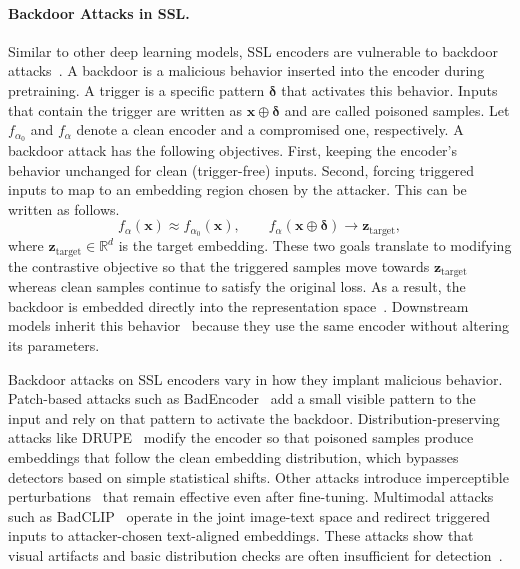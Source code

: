 \documentclass[letterpaper,twocolumn,10pt]{article}
\newcommand{\nhat}[1]{\textcolor{red}{Nhat: #1}}
\begin{document}

\paragraph{Backdoor Attacks in SSL.}
Similar to other deep learning models, SSL encoders are vulnerable to backdoor attacks~\cite{jia2022badencoder}. A backdoor is a malicious behavior inserted into the encoder during pretraining. A trigger is a specific pattern $\bm{\delta}$ that activates this behavior. Inputs that contain the trigger are written as $\mathbf{x} \oplus \bm{\delta}$ and are called poisoned samples.
Let $f_{\alpha_0}$ and $f_{\alpha}$ denote a clean encoder and a compromised one, respectively. A backdoor attack has the following objectives. First, keeping the encoder's behavior unchanged for clean (trigger-free) inputs. Second, forcing triggered inputs to map to an embedding region chosen by the attacker. This can be written as follows.
\begin{equation}
    f_{\alpha}(\mathbf{x}) \approx f_{\alpha_0}(\mathbf{x}),
    \qquad
    f_{\alpha}(\mathbf{x} \oplus \bm{\delta}) \rightarrow \mathbf{z}_{\text{target}},
\end{equation}
where $\mathbf{z}_{\text{target}} \in \mathbb{R}^{d}$ is the target embedding.
These two goals translate to modifying the contrastive objective so that the triggered samples move towards $\mathbf{z}_{\text{target}}$ whereas clean samples continue to satisfy the original loss. As a result, the backdoor is embedded directly into the representation space~\cite{jia2022badencoder}. Downstream models inherit this behavior~\cite{saha2022backdoor} because they use the same encoder without altering its parameters. 

\par Backdoor attacks on SSL encoders vary in how they implant malicious behavior. Patch-based attacks such as BadEncoder~\cite{jia2022badencoder} add a small visible pattern to the input and rely on that pattern to activate the backdoor. Distribution-preserving attacks like DRUPE~\cite{tao2024distribution} modify the encoder so that poisoned samples produce embeddings that follow the clean embedding distribution, which bypasses detectors based on simple statistical shifts. Other attacks introduce imperceptible perturbations~\cite{zhang2025invisible} that remain effective even after fine-tuning. Multimodal attacks such as BadCLIP~\cite{liang2024badclip} operate in the joint image-text space and redirect triggered inputs to attacker-chosen text-aligned embeddings. These attacks show that visual artifacts and basic distribution checks are often insufficient for detection~\cite{abad2025soklinedefensebackdoor}.
\end{document}
